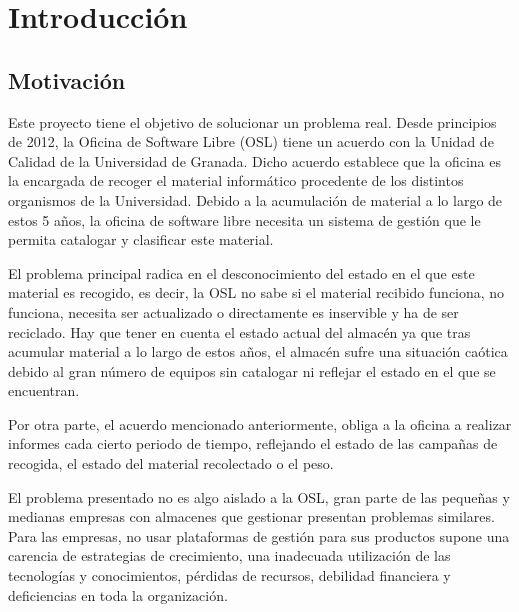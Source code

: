 \documentclass[a4paper,11pt]{book}
\begin{document}


\tableofcontents
\listoffigures
\listoftables

%

%


\chapter{Introducción}


\section{Motivación}

Este proyecto tiene el objetivo de solucionar un problema real. Desde principios de 2012, la Oficina de Software Libre (OSL) tiene un acuerdo con la Unidad de Calidad de la Universidad de Granada. Dicho acuerdo establece que la oficina es la encargada de recoger el material  informático procedente de los distintos organismos de la Universidad. Debido a la acumulación de material a lo largo de estos 5 años, la oficina de software libre necesita un sistema de gestión que le permita catalogar y clasificar este material.
  
El problema principal radica en el desconocimiento del estado en el que este material es recogido, es decir, la OSL no sabe si el material recibido funciona, no funciona, necesita ser actualizado o directamente es inservible y ha de ser reciclado. Hay que tener en cuenta el estado actual del almacén ya que tras acumular material a lo largo de estos años, el almacén sufre una situación caótica debido al gran número de equipos sin catalogar ni reflejar el estado en el que se encuentran. 

Por otra parte, el acuerdo mencionado anteriormente, obliga a la oficina a realizar informes cada cierto periodo de tiempo, reflejando el estado de las campañas de recogida, el estado del material recolectado o el peso.
  
El problema presentado no es algo aislado a la OSL, gran parte de las pequeñas y medianas empresas con almacenes que gestionar presentan problemas similares. Para las  empresas, no usar plataformas de gestión para sus productos supone una carencia de estrategias de crecimiento, una inadecuada utilización de las tecnologías y conocimientos, pérdidas de recursos, debilidad financiera y deficiencias en toda la organización. 
\end{document}
